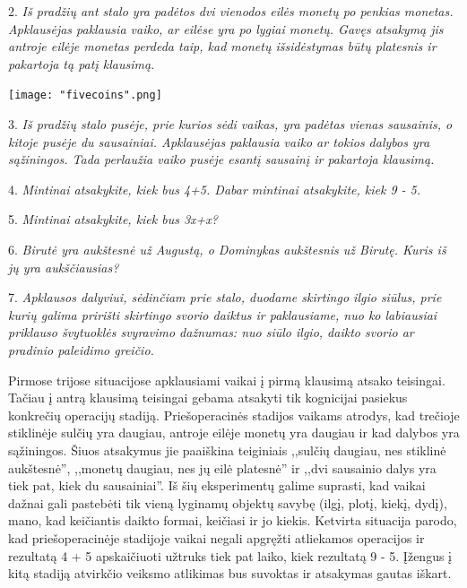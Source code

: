 \documentclass{article}
\begin{document}
\begin{minipage}[b]{0.79\linewidth} 2. \textit{Iš pradžių ant stalo yra padėtos dvi vienodos eilės monetų po penkias monetas. Apklausėjas paklausia vaiko, ar eilėse yra po lygiai monetų. Gavęs atsakymą jis antroje eilėje monetas perdeda taip, kad monetų išsidėstymas būtų platesnis ir pakartoja tą patį klausimą.} \end{minipage} \hspace{\fill} \begin{minipage}[b]{0.2\linewidth}\texttt{[image: "fivecoins".png]} \end{minipage}\newline

3. \textit{Iš pradžių stalo pusėje, prie kurios sėdi vaikas, yra padėtas vienas sausainis, o kitoje pusėje du sausainiai. Apklausėjas paklausia vaiko ar tokios dalybos yra sąžiningos. Tada perlaužia vaiko pusėje esantį sausainį ir pakartoja klausimą.}

4. \textit{Mintinai atsakykite, kiek bus 4+5. Dabar mintinai atsakykite, kiek 9 - 5.}\newline

5. \textit{Mintinai atsakykite, kiek bus 3x+x?}

6. \textit{Birutė yra aukštesnė už Augustą, o Dominykas aukštesnis už Birutę. Kuris iš jų yra aukščiausias?}

7. \textit{Apklausos dalyviui, sėdinčiam prie stalo, duodame skirtingo ilgio siūlus, prie kurių galima pririšti skirtingo svorio daiktus ir paklausiame, nuo ko labiausiai priklauso švytuoklės svyravimo dažnumas: nuo siūlo ilgio, daikto svorio ar pradinio paleidimo greičio.}

Pirmose trijose situacijose apklausiami vaikai į pirmą klausimą atsako teisingai. Tačiau į antrą klausimą teisingai gebama atsakyti tik kognicijai pasiekus konkrečių operacijų stadiją. Priešoperacinės stadijos vaikams atrodys, kad trečioje stiklinėje sulčių yra daugiau, antroje eilėje monetų yra daugiau ir kad dalybos yra sąžiningos. Šiuos atsakymus jie paaiškina teiginiais ,,sulčių daugiau, nes stiklinė aukštesnė'', ,,monetų daugiau, nes jų eilė platesnė'' ir ,,dvi sausainio dalys yra tiek pat, kiek du sausainiai''. Iš šių eksperimentų galime suprasti, kad vaikai dažnai gali pastebėti tik vieną lyginamų objektų savybę (ilgį, plotį, kiekį, dydį), mano, kad keičiantis daikto formai, keičiasi ir jo kiekis. Ketvirta situacija parodo, kad priešoperacinėje stadijoje vaikai negali apgręžti atliekamos operacijos ir rezultatą 4 + 5 apskaičiuoti užtruks tiek pat laiko, kiek rezultatą 9 - 5. Įžengus į kitą stadiją atvirkčio veiksmo atlikimas bus suvoktas ir atsakymas gautas iškart.
\end{document}
